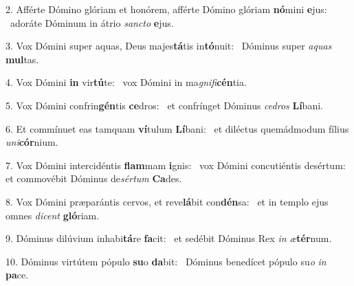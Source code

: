 2. Afférte Dómino glóriam et honórem, afférte Dómino glóriam \textbf{nó}mini \textbf{e}jus: \ast\  adoráte Dóminum in átrio \textit{sanc}\textit{to} \textbf{e}jus.\

3. Vox Dómini super aquas, Deus majes\textbf{tá}tis in\textbf{tó}nuit: \ast\  Dóminus super \textit{a}\textit{quas} \textbf{mul}tas.\

4. Vox Dómini \textbf{in} vir\textbf{tú}te: \ast\  vox Dómini in ma\textit{gni}\textit{fi}\textbf{cén}tia.\

5. Vox Dómini confrin\textbf{gén}tis \textbf{ce}dros: \ast\  et confrínget Dóminus \textit{ce}\textit{dros} \textbf{Lí}bani.\

6. Et commínuet eas tamquam \textbf{ví}tulum \textbf{Lí}bani: \ast\  et diléctus quemádmodum fílius \textit{u}\textit{ni}\textbf{cór}nium.\

7. Vox Dómini intercidéntis \textbf{flam}mam \textbf{i}gnis: \ast\  vox Dómini concutiéntis desértum: et commovébit Dóminus de\textit{sér}\textit{tum} \textbf{Ca}des.\

8. Vox Dómini præparántis cervos, et reve\textbf{lá}bit con\textbf{dén}sa: \ast\  et in templo ejus omnes \textit{di}\textit{cent} \textbf{gló}riam.\

9. Dóminus dilúvium inhabi\textbf{tá}re \textbf{fa}cit: \ast\  et sedébit Dóminus Rex \textit{in} \textit{æ}\textbf{tér}num.\

10. Dóminus virtútem pópulo \textbf{su}o \textbf{da}bit: \ast\  Dóminus benedícet pópulo su\textit{o} \textit{in} \textbf{pa}ce.\

